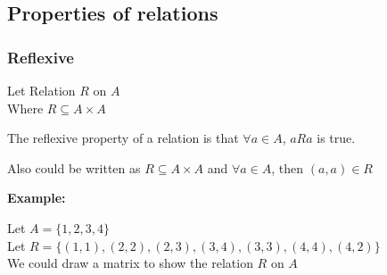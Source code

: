 \subsection{Properties of relations}

\begin{table}[H]
    \centering
\end{table}

\subsubsection{Reflexive}
Let Relation $R$ on $A$ \\
Where $R \subseteq A \times A$

The reflexive property of a relation is that $\forall a \in A$, $aRa$ is true.

Also could be written as $R \subseteq A \times A$ and $\forall a \in A$, then $(a,a) \in R$

\textbf{Example:}

Let $A = \{1,2,3,4\}$ \\
Let $R = \{(1,1),(2,2),(2,3),(3,4),(3,3),(4,4),(4,2)\}$ \\

We could draw a matrix to show the relation $R$ on $A$ \\

